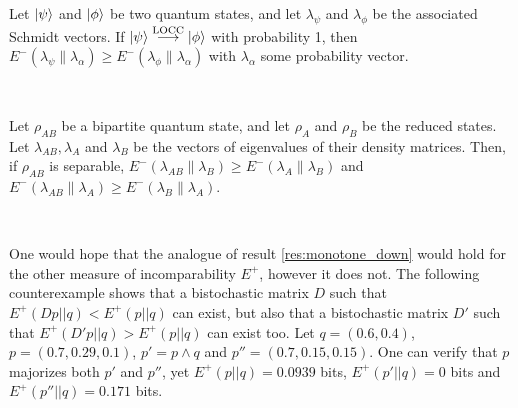 \begin{corollary}
    Let $\ket{\psi}$ and $\ket{\phi}$ be two quantum states, and let $\lambda_\psi$ and $\lambda_\phi$ be the associated Schmidt vectors. If $\ket{\psi} \overset{\text{LOCC}}{\longrightarrow} \ket{\phi}$ with probability 1, then $E^- (\lambda_\psi \parallel \lambda_\alpha) \geq E^- (\lambda_\phi \parallel \lambda_\alpha)$ with $\lambda_\alpha$ some probability vector.
\end{corollary}

~

\begin{corollary}
    Let $\rho_{AB}$ be a bipartite quantum state, and let $\rho_A$ and $\rho_B$ be the reduced states. Let $\lambda_{AB}, \lambda_A$ and $\lambda_B$ be the vectors of eigenvalues of their density matrices. Then, if $\rho_{AB}$ is separable, $E^- (\lambda_{AB} \parallel \lambda_B) \geq E^- (\lambda_A \parallel \lambda_B)$ and $E^- (\lambda_{AB} \parallel \lambda_A) \geq E^- (\lambda_B \parallel \lambda_A)$.
\end{corollary}

~

\noindent One would hope that the analogue of result \ref{res:monotone_down} would hold for the other measure of incomparability $E^+$, however it does not. The following counterexample shows that a bistochastic matrix $D$ such that $E^+ (Dp || q) < E^+ (p || q)$ can exist, but also that a bistochastic matrix $D'$ such that $E^+ (D'p || q) > E^+ (p || q)$ can exist too. Let $q = (0.6, 0.4)$, $p = (0.7, 0.29, 0.1)$, $p' = p \wedge q$ and $p'' = (0.7, 0.15, 0.15)$. One can verify that $p$ majorizes both $p'$ and $p''$, yet $E^+ (p || q) = 0.0939$ bits, $E^+ (p' || q) = 0$ bits and $E^+ (p'' || q) = 0.171$ bits.